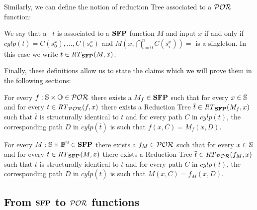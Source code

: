 \begin{conditional}{\notappendix}
  Similarly, we can define the notion of reduction Tree associated to a $\mathcal{POR}$
  function:

  \begin{defn}
    We say that a \rt \Nat \Ss\ $t$ is associated to a $\mathbf{SFP}$ function $M$ and
    input $x$ if and only if $\mathit{cylp}(t)= C(s^x_0), \ldots,  C(s^x_n)$
    and $M(x,\bigcap_{i=0}^n C(s^x_i))=$ is a singleton. In this case we write
    $t \in \mathit{RT}_{\mathbf{SFP}}(M, x)$.
  \end{defn}

  Finally, these definitions allow us to state the claims which we will prove them
  in the following sections:

  \begin{prop}
    For every $f: \mathbb{S} \times \mathbb{O} \in \mathcal{POR}$ there exists a $M_f \in \mathbf{SFP}$ such that
    for every $x \in \mathbb{S}$ and for every $t \in \mathit{RT}_{\mathcal{POR}}(f, x)$ there exists a
    Reduction Tree $\overline t \in \mathit{RT}_{\mathbf{SFP}}(M_f, x)$ such that $\overline t$
    is structurally identical to $t$ and for every path $C$ in $\mathit{cylp}(t)$,
    the corresponding path $D$ in $\mathit{cylp}(\overline t)$ is such that
    $f(x, C) = M_f(x, D)$.
  \end{prop}

  \begin{prop}
    For every $M: \mathbb{S} \times \mathbb{B}^{\mathbb{N}} \in \mathbf{SFP}$ there exists a $f_M \in \mathcal{POR}$ such that
    for every $x \in \mathbb{S}$ and for every $t \in \mathit{RT}_{\mathbf{SFP}}(M, x)$ there exists a
    Reduction Tree $\overline t \in \mathit{RT}_{\mathcal{POR}}(f_M, x)$ such that $\overline t$
    is structurally identical to $t$ and for every path $C$ in $\mathit{cylp}(t)$,
    the corresponding path $D$ in $\mathit{cylp}(\overline t)$ is such that
    $M(x, C) = f_M(x, D)$.
  \end{prop}



\end{conditional}










\subsection{From $\mathbf{SFP}$ to $\mathcal{POR}$ functions}
\label{sec:SFPtoPOR}


